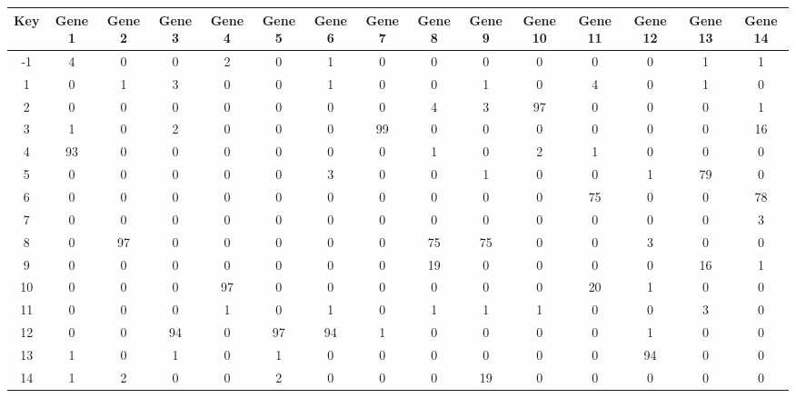 \begin{tabular}{|c|c|c|c|c|c|c|c|c|c|c|c|c|c|c|}
\hline
Key & Gene 1 & Gene 2 & Gene 3 & Gene 4 & Gene 5 & Gene 6 & Gene 7 & Gene 8 & Gene 9 & Gene 10 & Gene 11 & Gene 12 & Gene 13 & Gene 14 \\
\hline
-1 & 4 & 0 & 0 & 2 & 0 & 1 & 0 & 0 & 0 & 0 & 0 & 0 & 1 & 1 \\
1 & 0 & 1 & 3 & 0 & 0 & 1 & 0 & 0 & 1 & 0 & 4 & 0 & 1 & 0 \\
2 & 0 & 0 & 0 & 0 & 0 & 0 & 0 & 4 & 3 & 97 & 0 & 0 & 0 & 1 \\
3 & 1 & 0 & 2 & 0 & 0 & 0 & 99 & 0 & 0 & 0 & 0 & 0 & 0 & 16 \\
4 & 93 & 0 & 0 & 0 & 0 & 0 & 0 & 1 & 0 & 2 & 1 & 0 & 0 & 0 \\
5 & 0 & 0 & 0 & 0 & 0 & 3 & 0 & 0 & 1 & 0 & 0 & 1 & 79 & 0 \\
6 & 0 & 0 & 0 & 0 & 0 & 0 & 0 & 0 & 0 & 0 & 75 & 0 & 0 & 78 \\
7 & 0 & 0 & 0 & 0 & 0 & 0 & 0 & 0 & 0 & 0 & 0 & 0 & 0 & 3 \\
8 & 0 & 97 & 0 & 0 & 0 & 0 & 0 & 75 & 75 & 0 & 0 & 3 & 0 & 0 \\
9 & 0 & 0 & 0 & 0 & 0 & 0 & 0 & 19 & 0 & 0 & 0 & 0 & 16 & 1 \\
10 & 0 & 0 & 0 & 97 & 0 & 0 & 0 & 0 & 0 & 0 & 20 & 1 & 0 & 0 \\
11 & 0 & 0 & 0 & 1 & 0 & 1 & 0 & 1 & 1 & 1 & 0 & 0 & 3 & 0 \\
12 & 0 & 0 & 94 & 0 & 97 & 94 & 1 & 0 & 0 & 0 & 0 & 1 & 0 & 0 \\
13 & 1 & 0 & 1 & 0 & 1 & 0 & 0 & 0 & 0 & 0 & 0 & 94 & 0 & 0 \\
14 & 1 & 2 & 0 & 0 & 2 & 0 & 0 & 0 & 19 & 0 & 0 & 0 & 0 & 0 \\
\hline
\end{tabular}